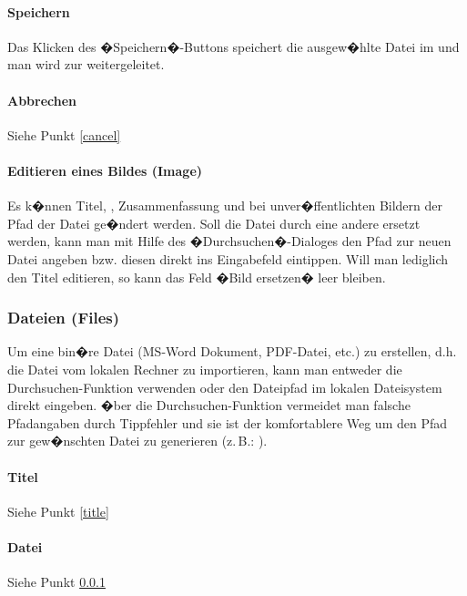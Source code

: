 \paragraph{Speichern}
\label{upload}
Das Klicken des �Speichern�-Buttons speichert die ausgew�hlte Datei im  und
man wird zur  weitergeleitet.

\paragraph{Abbrechen}
Siehe Punkt \ref{cancel}

\paragraph{Editieren eines Bildes (Image)}
\label{edit-image}
Es k�nnen Titel, , Zusammenfassung und bei unver�ffentlichten Bildern der Pfad der Datei ge�ndert
werden. Soll die Datei durch eine andere ersetzt werden, kann man mit
Hilfe des �Durchsuchen�-Dialoges den Pfad zur neuen Datei angeben bzw.
diesen direkt ins Eingabefeld eintippen. Will man lediglich den Titel
editieren, so kann das Feld �Bild ersetzen� leer bleiben.

\subsubsection{Dateien (Files)}
\label{dateien}
Um eine bin�re Datei (MS-Word Dokument, PDF-Datei, etc.) zu erstellen, d.h. die
Datei vom lokalen Rechner zu importieren, kann man entweder die
Durchsuchen-Funktion verwenden oder den Dateipfad im lokalen Dateisystem direkt
eingeben. �ber die Durchsuchen-Funktion vermeidet man falsche Pfadangaben
durch Tippfehler und sie ist der komfortablere Weg um den Pfad zur gew�nschten
Datei zu generieren (z.\,B.: ).

%

\paragraph{Titel}
Siehe Punkt \ref{title}

\paragraph{Datei}
Siehe Punkt \ref{dateien}

